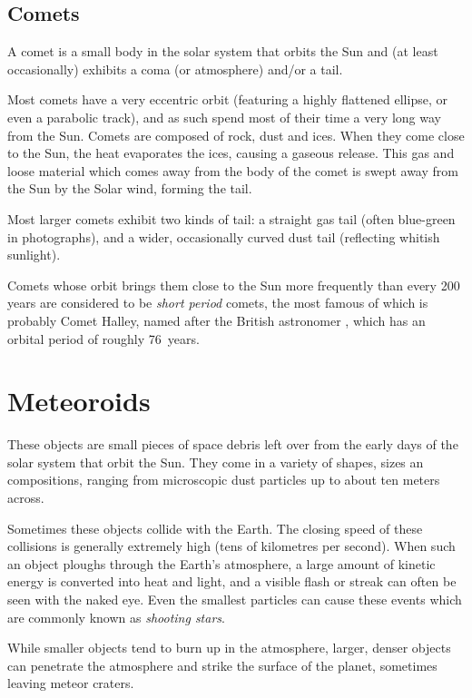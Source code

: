 \subsection{Comets}
\label{sec:Phenomena:Comets}

A comet is a small body in the solar system that orbits the Sun and (at
least occasionally) exhibits a coma (or atmosphere) and/or a tail.

Most comets have a very eccentric orbit (featuring a highly flattened
ellipse, or even a parabolic track), and as such spend most of their
time a very long way from the Sun. Comets are composed of rock, dust
and ices. When they come close to the Sun, the heat evaporates the
ices, causing a gaseous release. This gas and loose material which
comes away from the body of the comet is swept away from the Sun by
the Solar wind, forming the tail.

Most larger comets exhibit two kinds of tail: a straight gas tail
(often blue-green in photographs), and a wider, occasionally curved
dust tail (reflecting whitish sunlight).

Comets whose orbit brings them close to the Sun more frequently than
every 200 years are considered to be \emph{short period} comets, the
most famous of which is probably Comet Halley, named after the British
astronomer , which has an orbital period of
roughly 76~years.


\section{Meteoroids}
\label{sec:Phenomena:Meteoroids}

These objects are small pieces of space debris left over from the early
days of the solar system that orbit the Sun. They come in a variety of
shapes, sizes an compositions, ranging from microscopic dust particles
up to about ten meters across.

Sometimes these objects collide with the Earth. The closing speed of
these collisions is generally extremely high (tens of kilometres per
second). When such an object ploughs through the Earth's atmosphere, a
large amount of kinetic energy is converted into heat and light, and a
visible flash or streak can often be seen with the naked eye. Even the
smallest particles can cause these events which are commonly known as
\emph{shooting stars}.

While smaller objects tend to burn up in the atmosphere, larger, denser
objects can penetrate the atmosphere and strike the surface of the
planet, sometimes leaving meteor craters.

